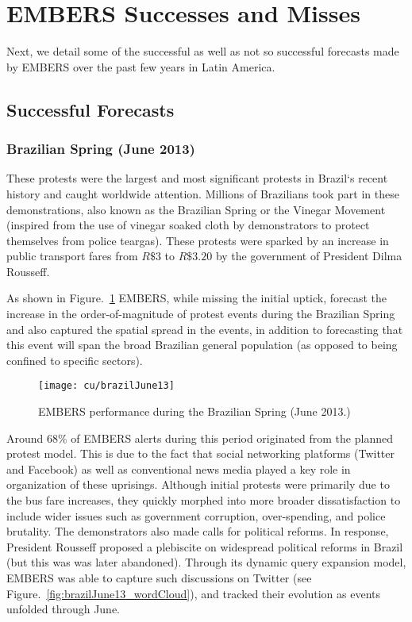\section{EMBERS Successes and Misses}
Next, we detail
some of the successful as well as not so successful forecasts made by EMBERS over 
the past few years in Latin America.
\subsection{Successful Forecasts}
\subsubsection*{Brazilian Spring (June 2013)}
These protests were the largest and most
significant protests in Brazil`s recent history and caught worldwide
attention. Millions of Brazilians took part in these demonstrations,
also known as the Brazilian Spring or the Vinegar Movement (inspired
from the use of vinegar soaked cloth by demonstrators to protect
themselves from police teargas). These protests were
sparked by an increase in public transport fares from $R\$3$ 
to $R\$3.20$ by the government of President Dilma Rousseff.

As shown in Figure.~\ref{fig:brazilJune13} EMBERS, while missing the initial uptick,
forecast the increase in the order-of-magnitude of protest events
during the Brazilian Spring and also captured
the spatial spread in the events, in addition to forecasting that this event
will span the broad Brazilian general population (as opposed to being confined to
specific sectors).

\begin{figure}[H]
\centering
\texttt{[image: cu/brazilJune13]}
\caption{EMBERS performance during the Brazilian Spring (June 2013.)}
\label{fig:brazilJune13}
\end{figure}

Around 68\% of EMBERS alerts during this period originated from
the planned protest model.
This is due to the fact that
social networking
platforms (Twitter and Facebook) as well as conventional news media played a key
role in organization of these uprisings. Although initial protests were
primarily due to the bus fare increases, they quickly morphed into
more broader dissatisfaction to include wider issues such as
government corruption, over-spending, and police brutality. The
demonstrators also made calls for political reforms. In response, President
Rousseff proposed a plebiscite on widespread political reforms in
Brazil (but this was was later abandoned). Through its dynamic query expansion model,
EMBERS was able to capture such discussions on Twitter 
(see Figure.~\ref{fig:brazilJune13_wordCloud}), and tracked their evolution as events
unfolded through June.

